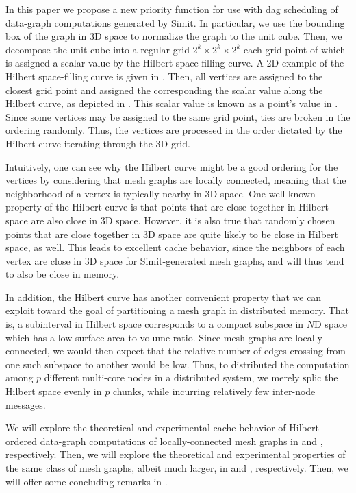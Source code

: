 In this paper we propose a new priority function for 
use with dag scheduling of data-graph computations generated
by Simit.  In particular, we use the bounding box of the
graph in 3D space to normalize the graph to the
unit cube.  Then, we decompose the unit cube into a regular
grid $2^k \times 2^k \times 2^k$ each grid point of which
is assigned a scalar value by the Hilbert space-filling curve.
A 2D example of the Hilbert space-filling
curve is given in .  Then, all vertices
are assigned to the closest grid point and assigned the 
corresponding the scalar value along the Hilbert curve, as
depicted in .  This
scalar value is known as a point's value in .  
Since some vertices may be assigned to the same grid point, ties
are broken in the ordering randomly.  Thus, the vertices are 
processed in the order dictated by the Hilbert curve iterating
through the 3D grid.

Intuitively, one can see why the Hilbert curve might be a good
ordering for the vertices by considering that mesh graphs
are locally connected, meaning that the neighborhood of a vertex
is typically nearby in 3D space.  One well-known property
of the Hilbert curve is that points that are close together
in Hilbert space are also close in 3D space.  However, it is also
true that randomly chosen points that are close together in 
3D space are quite likely to be close in Hilbert space, as well.
This leads to excellent cache behavior, since the neighbors of
each vertex are close in 3D space for Simit-generated mesh graphs,
and will thus tend to also be close in memory.

In addition, the Hilbert curve has another convenient property
that we can exploit toward the goal of partitioning a mesh graph
in distributed memory.  That is, a subinterval in Hilbert space
corresponds to a compact subspace in $N$D space which has a
low surface area to volume ratio.  Since mesh graphs are locally
connected, we would then expect that the relative number of edges crossing
from one such subspace to another would be low.  Thus, to
distributed the computation among $p$ different multi-core
nodes in a distributed system, we merely splic the Hilbert space
evenly in $p$ chunks, while incurring relatively few inter-node
messages.


We will explore the theoretical and experimental 
cache behavior of Hilbert-ordered 
data-graph computations of locally-connected mesh graphs in
 and , respectively.
Then, we will explore the theoretical and experimental
properties of the same class of mesh graphs, albeit much larger,
in  and , respectively.
Then, we will offer some concluding remarks in .


